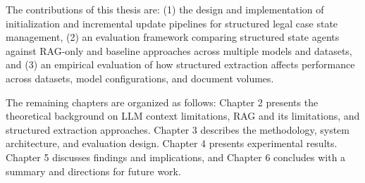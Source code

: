 The contributions of this thesis are: (1) the design and implementation of initialization
and incremental update pipelines for structured legal case state management, (2) an
evaluation framework comparing structured state agents against RAG-only and baseline
approaches across multiple models and datasets, and (3) an empirical evaluation of how
structured extraction affects performance across datasets, model configurations, and
document volumes.

The remaining chapters are organized as follows: Chapter 2 presents the theoretical
background on LLM context limitations, RAG and its limitations, and structured
extraction approaches. Chapter 3 describes the methodology, system architecture, and
evaluation design. Chapter 4 presents experimental results. Chapter 5 discusses
findings and implications, and Chapter 6 concludes with a summary and directions for
future work.
